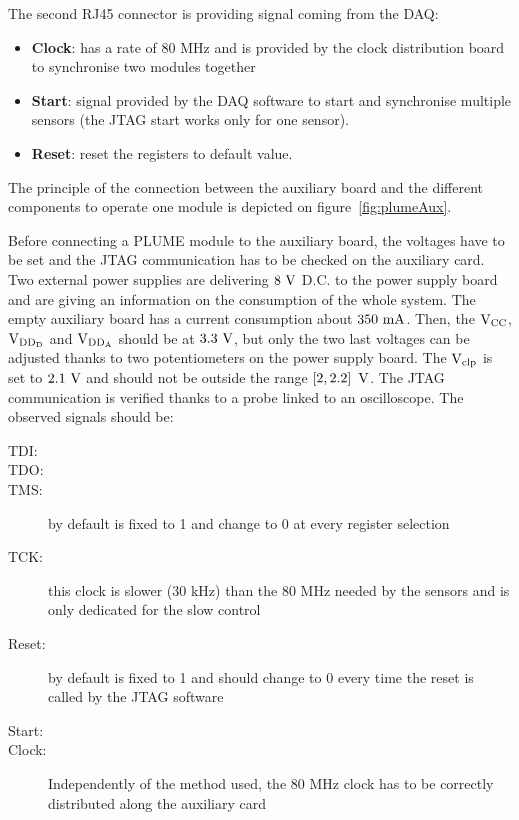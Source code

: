   The second RJ45 connector is providing signal coming from the \gls{DAQ}:
  \begin{itemize}
    \item \textbf{Clock}: has a rate of 80 MHz and is provided by the clock distribution board to synchronise two modules together
    \item \textbf{Start}: signal provided by the \gls{DAQ} software to start and synchronise multiple sensors (the \gls{JTAG} start works only for one sensor).
    \item \textbf{Reset}: reset the registers to default value. 
  \end{itemize}

  The principle of the connection between the auxiliary board and the different components to operate one module is depicted on figure~\ref{fig:plumeAux}.

  Before connecting a PLUME module to the auxiliary board, the voltages have to be set and the \gls{JTAG} communication has to be checked on the auxiliary card.
  Two external power supplies are delivering $8~\rm{V}$ D.C. to the power supply board and are giving an information on the consumption of the whole system.
  The empty auxiliary board has a current consumption about $350~\rm{mA}$.
  Then, the $\rm{V}_{\rm{CC}}$, $\rm{V}_{\rm{DD_D}}$ and $\rm{V}_{\rm{DD_A}}$ should be at $3.3~\rm{V}$, but only the two last voltages can be adjusted thanks to two potentiometers on the power supply board.
  The $\rm{V}_{\rm{clp}}$ is set to $2.1~\rm{V}$ and should not be outside the range $\left[2, 2.2\right]~\rm{V}$.
  The \gls{JTAG} communication is verified thanks to a probe linked to an oscilloscope.
  The observed signals should be:

  \begin{description}
    \item[\gls{TDI}:]
    \item[\gls{TDO}:]
    \item[\gls{TMS}:] by default is fixed to 1 and change to 0 at every register selection
    \item[\gls{TCK}:] this clock is slower (30 kHz) than the 80 MHz needed by the sensors and is only dedicated for the slow control
    \item[Reset:] by default is fixed to 1 and should change to 0 every time the reset is called by the \gls{JTAG} software
    \item[Start:] 
    \item[Clock:] Independently of the method used, the 80 MHz clock has to be correctly distributed along the auxiliary card
  \end{description}

